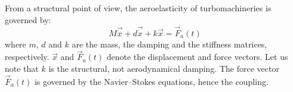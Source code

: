 
From a structural point of view, the aeroelasticity
of turbomachineries is governed by:
\begin{equation}
	M \vec{\ddot{x}} + d \vec{\dot{x}} + k \vec{x} = \vec{F}_a(t)
	\label{eq:ael_motion_eq}
\end{equation}
where $m$, $d$ and $k$ are the mass, the damping and the stiffness matrices, respectively.
$\vec{x}$ and $\vec{F}_a(t)$ denote the displacement and force vectors.
Let us note that $k$ is the structural, not aerodynamical damping.
The force vector $\vec{F}_a(t)$ is governed by the Navier--Stokes
equations, hence the coupling.